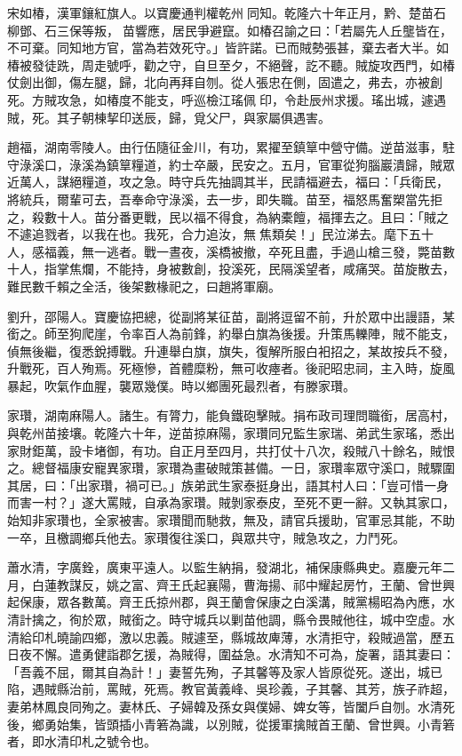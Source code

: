 \begin{pinyinscope}
宋如椿，漢軍鑲紅旗人。以寶慶通判權乾州同知。乾隆六十年正月，黔、楚苗石柳鄧、石三保等叛，苗響應，居民爭避竄。如椿召諭之曰：「若屬先人丘壟皆在，不可棄。同知地方官，當為若效死守。」皆許諾。已而賊勢張甚，棄去者大半。如椿被發徒跣，周走號呼，勸之守，自旦至夕，不絕聲，訖不聽。賊旋攻西門，如椿仗劍出御，傷左腿，歸，北向再拜自刎。從人張忠在側，固遣之，弗去，亦被創死。方賊攻急，如椿度不能支，呼巡檢江瑤佩印，令赴辰州求援。瑤出城，遽遇賊，死。其子朝棟挈印送辰，歸，覓父尸，與家屬俱遇害。

趙福，湖南零陵人。由行伍隨征金川，有功，累擢至鎮筸中營守備。逆苗滋事，駐守淥溪口，淥溪為鎮筸糧道，約士卒嚴，民安之。五月，官軍從狗腦巖潰歸，賊眾近萬人，謀絕糧道，攻之急。時守兵先抽調其半，民請福避去，福曰：「兵衛民，將統兵，爾輩可去，吾奉命守淥溪，去一步，即失職。苗至，福怒馬奮槊當先拒之，殺數十人。苗分番更戰，民以福不得食，為納橐饘，福揮去之。且曰：「賊之不遽追戮者，以我在也。我死，合力追汝，無焦類矣！」民泣涕去。麾下五十人，感福義，無一逃者。戰一晝夜，溪橋被撤，卒死且盡，手過山槍三發，斃苗數十人，指掌焦爛，不能持，身被數創，投溪死，民隔溪望者，咸痛哭。苗旋散去，難民數千賴之全活，後架數椽祀之，曰趙將軍廟。

劉升，邵陽人。寶慶協把總，從副將某征苗，副將逗留不前，升於眾中出謾語，某銜之。師至狗爬崖，令率百人為前鋒，約舉白旗為後援。升策馬轢陣，賊不能支，偵無後繼，復悉銳搏戰。升連舉白旗，旗失，復解所服白衵招之，某故按兵不發，升戰死，百人殉焉。死極慘，首體糜粉，無可收瘞者。後祀昭忠祠，主入時，旋風暴起，吹氣作血腥，襲眾幾僕。時以鄉團死最烈者，有滕家瓚。

家瓚，湖南麻陽人。諸生。有膂力，能負鐵砲擊賊。捐布政司理問職銜，居高村，與乾州苗接壤。乾隆六十年，逆苗掠麻陽，家瓚同兄監生家瑞、弟武生家瑤，悉出家財鉅萬，設卡堵御，有功。自正月至四月，共打仗十八次，殺賊八十餘名，賊恨之。總督福康安寵異家瓚，家瓚為畫破賊策甚備。一日，家瓚率眾守溪口，賊驟圍其居，曰：「出家瓚，禍可已。」族弟武生家泰挺身出，語其村人曰：「豈可惜一身而害一村？」遂大罵賊，自承為家瓚。賊剝家泰皮，至死不更一辭。又執其家口，始知非家瓚也，全家被害。家瓚聞而馳救，無及，請官兵援助，官軍忌其能，不助一卒，且檄調鄉兵他去。家瓚復往溪口，與眾共守，賊急攻之，力鬥死。

蕭水清，字廣銓，廣東平遠人。以監生納捐，發湖北，補保康縣典史。嘉慶元年二月，白蓮教謀反，姚之富、齊王氏起襄陽，曹海揚、祁中耀起房竹，王蘭、曾世興起保康，眾各數萬。齊王氏掠州郡，與王蘭會保康之白溪溝，賊黨楊昭為內應，水清計擒之，徇於眾，賊銜之。時守城兵以剿苗他調，縣令畏賊他往，城中空虛。水清給印札曉諭四鄉，激以忠義。賊遽至，縣城故庳薄，水清拒守，殺賊過當，歷五日夜不懈。遣勇健詣郡乞援，為賊得，圍益急。水清知不可為，旋署，語其妻曰：「吾義不屈，爾其自為計！」妻誓先殉，子其馨等及家人皆原從死。遂出，城已陷，遇賊縣治前，罵賊，死焉。教官黃義峰、吳珍義，子其馨、其芳，族子祚超，妻弟林鳳良同殉之。妻林氏、子婦韓及孫女與僕婦、婢女等，皆闔戶自刎。水清死後，鄉勇始集，皆頭插小青箬為識，以別賊，從援軍擒賊首王蘭、曾世興。小青箬者，即水清印札之號令也。


\end{pinyinscope}
